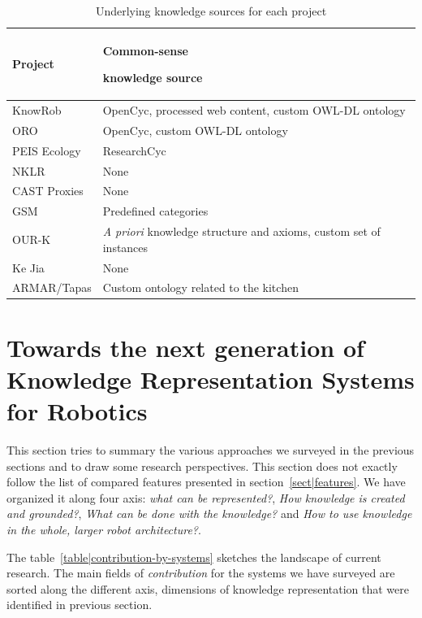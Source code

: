 \documentclass[a4paper, twocolumn]{article}
\begin{document}
\begin{table}
\begin{center}

\begin{tabular}{lp{4cm}}
\toprule
{\bf Project} & {\bf Common-sense \par knowledge source} \\
\midrule
{\sc KnowRob} & {\sc OpenCyc}, processed web content, custom OWL-DL ontology \\
ORO & {\sc OpenCyc}, custom OWL-DL ontology \\
PEIS Ecology & {\sc ResearchCyc} \\
NKLR &  None \\
CAST Proxies &  None \\
GSM &  Predefined categories \\
OUR-K & {\it A priori} knowledge structure and axioms, custom set of instances\\
Ke Jia & None \\
ARMAR/{\sc Tapas} & Custom ontology related to the kitchen\\

\bottomrule

\end{tabular}
\end{center}
\caption{Underlying knowledge sources for each project}
\label{table|knowledge-sources}
\end{table}


\section{Towards the next generation of Knowledge Representation Systems for Robotics}
\label{sect|conclusion}

This section tries to summary the various approaches we surveyed in the
previous sections and to draw some research perspectives. This section does not
exactly follow the list of compared features presented in
section~\ref{sect|features}. We have organized it along four axis: \emph{what
can be represented?}, \emph{How knowledge is created and grounded?}, \emph{What
can be done with the knowledge?} and \emph{How to use knowledge in the whole,
larger robot architecture?}.

The table~\ref{table|contribution-by-systems} sketches the landscape of current
research. The main fields of \emph{contribution} for the systems we have
surveyed are sorted along the different axis, dimensions of knowledge
representation that were identified in previous section.
\end{document}
